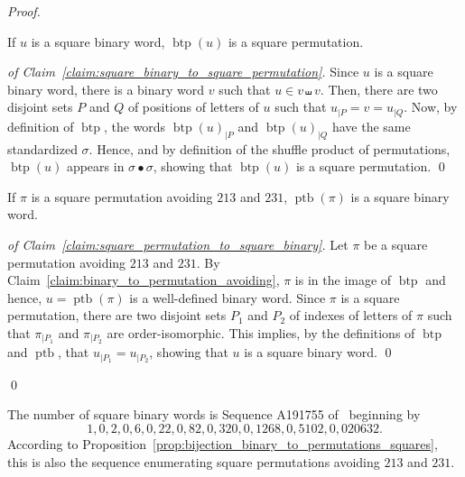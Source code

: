 \documentclass[a4paper]{llncs}
\DeclareMathOperator{\SHUFFLE}{\bullet}
\DeclareMathOperator{\BINTOPERM}{\mathrm{btp}}
\DeclareMathOperator{\PERMTOBIN}{\mathrm{ptb}}
\begin{document}
\begin{proof}
    \begin{claim} \label{claim:square_binary_to_square_permutation}
        If $u$ is a square binary word, $\BINTOPERM(u)$ is a square
        permutation.
    \end{claim}
    \begin{proof}[of Claim~\ref{claim:square_binary_to_square_permutation}]
        Since $u$ is a square binary word, there is a binary word $v$
        such that $u \in v \shuffle v$. Then, there are two disjoint
        sets $P$ and $Q$ of positions of letters of $u$ such that
        $u_{|P} = v = u_{|Q}$. Now, by definition of $\BINTOPERM$, the
        words $\BINTOPERM(u)_{|P}$ and $\BINTOPERM(u)_{|Q}$ have the
        same standardized $\sigma$. Hence, and by definition of
        the shuffle product of permutations, $\BINTOPERM(u)$ appears in
        $\sigma \SHUFFLE \sigma$, showing that $\BINTOPERM(u)$ is a
        square permutation.
        \qed
    \end{proof}

    \begin{claim} \label{claim:square_permutation_to_square_binary}
        If $\pi$ is a square permutation avoiding $213$ and $231$,
        $\PERMTOBIN(\pi)$ is a square binary word.
    \end{claim}
    \begin{proof}[of Claim~\ref{claim:square_permutation_to_square_binary}]
        Let $\pi$ be a square permutation avoiding $213$ and $231$. By
        Claim~\ref{claim:binary_to_permutation_avoiding}, $\pi$ is in
        the image of $\BINTOPERM$ and hence, $u = \PERMTOBIN(\pi)$ is a
        well-defined binary word. Since $\pi$ is a square permutation,
        there are two disjoint sets $P_1$ and $P_2$ of indexes of letters
        of $\pi$ such that $\pi_{|P_1}$ and $\pi_{|P_2}$ are
        order-isomorphic. This implies, by the definitions of $\BINTOPERM$
        and $\PERMTOBIN$, that $u_{|P_1} = u_{|P_2}$, showing that $u$
        is a square binary word.
        \qed
    \end{proof}
    \qed
\end{proof}

The number of square binary words is Sequence A191755 of~\cite{Slo}
beginning by
\begin{equation}
1, 0, 2, 0, 6, 0, 22, 0, 82, 0, 320, 0, 1268, 0, 5102, 0, 020632.
\end{equation}
According to
Proposition~\ref{prop:bijection_binary_to_permutations_squares}, this
is also the sequence enumerating square permutations avoiding $213$
and $231$.
\end{document}
